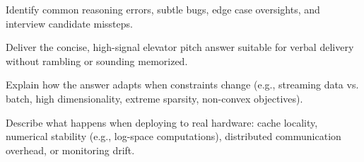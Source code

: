 
\begin{mistakebox}
Identify common reasoning errors, subtle bugs, edge case oversights, and interview candidate missteps.
\end{mistakebox}

\begin{shortcutbox}
Deliver the concise, high-signal elevator pitch answer suitable for verbal delivery without rambling or sounding memorized.
\end{shortcutbox}

\begin{variantbox}
Explain how the answer adapts when constraints change (e.g., streaming data vs. batch, high dimensionality, extreme sparsity, non-convex objectives).
\end{variantbox}

\begin{groundrealitybox}
Describe what happens when deploying to real hardware: cache locality, numerical stability (e.g., log-space computations), distributed communication overhead, or monitoring drift.
\end{groundrealitybox}

